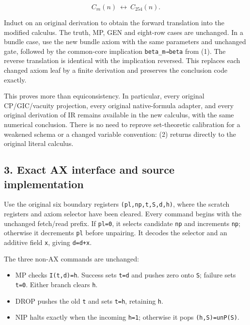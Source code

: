 \[
C_m(n)\ \longleftrightarrow\ C_{254}(n).
\tag{2}
\]

Induct on an original derivation to obtain the forward translation into
the modified calculus. The truth, MP, GEN and eight-row cases are
unchanged. In a bundle case, use the new bundle axiom with the same
parameters and unchanged gate, followed by the common-core implication
\texttt{beta\_m→beta} from (1). The reverse translation is identical
with the implication reversed. This replaces each changed axiom leaf by
a finite derivation and preserves the conclusion code exactly.

This proves more than equiconsistency. In particular, every original
CP/GIC/vacuity projection, every original native-formula adapter, and
every original derivation of IR remains available in the new calculus,
with the same numerical conclusion. There is no need to reprove
set-theoretic calibration for a weakened schema or a changed variable
convention: (2) returns directly to the original literal calculus.

\hypertarget{exact-ax-interface-and-source-implementation}{%
\subsection{3. Exact AX interface and source
implementation}\label{exact-ax-interface-and-source-implementation}}

Use the original six boundary registers \texttt{(pl,np,t,S,d,h)}, where
the scratch registers and axiom selector have been cleared. Every
command begins with the unchanged fetch/read prefix. If \texttt{pl=0},
it selects candidate \texttt{np} and increments \texttt{np}; otherwise
it decrements \texttt{pl} before unpairing. It decodes the selector and
an additive field \texttt{x}, giving \texttt{d\textquotesingle{}=d+x}.

The three non-AX commands are unchanged:

\begin{itemize}
\tightlist
\item
  MP checks \texttt{I(t,d\textquotesingle{})=h}. Success sets
  \texttt{t=d\textquotesingle{}} and pushes zero onto \texttt{S};
  failure sets \texttt{t=0}. Either branch clears \texttt{h}.
\item
  DROP pushes the old \texttt{t} and sets \texttt{t=h}, retaining
  \texttt{h}.
\item
  NIP halts exactly when the incoming \texttt{h=1}; otherwise it pops
  \texttt{(h,S)=unP(S)}.
\end{itemize}

